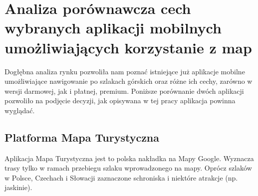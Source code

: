 \section{Analiza porównawcza cech wybranych aplikacji mobilnych umożliwiających korzystanie z map} \label{roz:opis_srodowisk}

Dogłębna analiza rynku pozwoliła nam poznać istniejące już aplikacje mobilne umożliwiające nawigowanie po szlakach górskich oraz różne ich cechy, zarówno w wersji darmowej, jak i płatnej, premium. Poniższe porównanie  dwóch aplikacji pozwoliło na podjęcie decyzji, jak opisywana w tej pracy aplikacja powinna wyglądać.

\subsection{Platforma Mapa Turystyczna}
Aplikacja Mapa Turystyczna \cite{mapatu} jest to polska nakładka na Mapy Google. Wyznacza trasy tylko w ramach przebiegu szlaku wprowadzonego na mapy. Oprócz szlaków w Polsce, Czechach i Słowacji zaznaczone schroniska i niektóre atrakcje (np. jaskinie).

